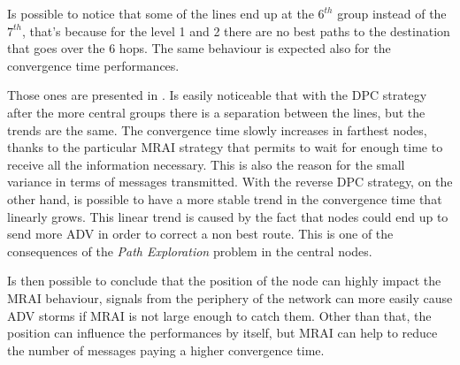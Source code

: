 Is possible to notice that some of the lines end up at the $6^{th}$ group instead
of the $7^{th}$, that's because for the level \num{1} and \num{2} there are
no best paths to the destination that goes over the \num{6} hops.
The same behaviour is expected also for the convergence time performances.

Those ones are presented in .
Is easily noticeable that with the \ac{DPC} strategy after the
more central groups there is a separation between the lines, but the trends
are the same.
The convergence time slowly increases in farthest nodes, thanks to the particular
\ac{MRAI} strategy that permits to wait for enough time to receive all the information
necessary.
This is also the reason for the small variance in terms of messages transmitted.
With the reverse \ac{DPC} strategy, on the other hand, is possible to have a
more stable trend in the convergence time that linearly grows.
This linear trend is caused by the fact that nodes could end up to send more
\ac{ADV} in order to correct a non best route.
This is one of the consequences of the \textit{Path Exploration} problem in
the central nodes.

Is then possible to conclude that the position of the node can highly impact
the \ac{MRAI} behaviour, signals from the periphery of the network can more
easily cause \ac{ADV} storms if \ac{MRAI} is not large enough to catch them.
Other than that, the position can influence the performances by itself, but
\ac{MRAI} can help to reduce the number of messages paying a higher convergence
time.

